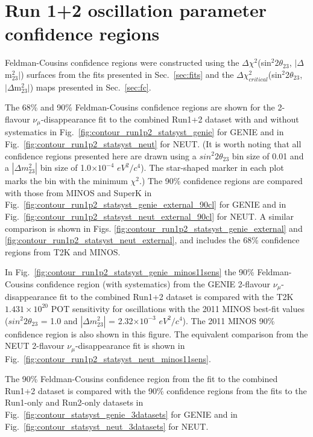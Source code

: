 \section {Run 1+2 oscillation parameter confidence regions }
\label{sec:conf_regions}

Feldman-Cousins confidence regions were constructed using the 
$\Delta\chi^{2}$(sin$^{2}$2$\theta_{23}$, $|\Delta$m$^{2}_{23}|$) surfaces
from the fits presented in Sec.\ \ref{sec:fits} and the
$\Delta\chi^{2}_{critical}$(sin$^{2}$2$\theta_{23}$, $|\Delta$m$^{2}_{23}|$) maps
presented in Sec.\ \ref{sec:fc}.

The 68\% and 90\% Feldman-Cousins confidence regions are shown for the
2-flavour $\nu_{\mu}$-disappearance fit to the combined Run1+2 dataset 
with and without systematics
in Fig.\ \ref{fig:contour_run1p2_statsyst_genie} for GENIE and
in Fig.\ \ref{fig:contour_run1p2_statsyst_neut} for NEUT.
(It is worth noting that all confidence regions presented here are drawn
using a $sin^{2}2\theta_{23}$ bin size of 0.01 and 
a $|\Delta m^{2}_{23}|$ bin size of 1.0$\times10^{-4}$ $eV^{2}/c^{4}$).
The star-shaped marker in each plot marks the bin with the minimum $\chi^{2}$.)
The 90\% confidence regions are compared with those from 
MINOS \cite{Minos2011} and SuperK \cite{OldDisappSuperK}
in Fig.\ \ref{fig:contour_run1p2_statsyst_genie_external_90cl} for GENIE and
in Fig.\ \ref{fig:contour_run1p2_statsyst_neut_external_90cl} for NEUT.
A similar comparison is shown in Figs.
\ref{fig:contour_run1p2_statsyst_genie_external} and
\ref{fig:contour_run1p2_statsyst_neut_external}, and
includes the 68\% confidence regions from T2K and MINOS.

In Fig.\ \ref{fig:contour_run1p2_statsyst_genie_minos11sens}
the 90\% Feldman-Cousins confidence region (with systematics) from the GENIE
2-flavour $\nu_{\mu}$-disappearance fit to the combined Run1+2 dataset 
is compared with the T2K $1.431 \times 10^{20}$ POT sensitivity for oscillations
with the 2011 MINOS best-fit values
($sin^{2}2\theta_{23}$ = 1.0 and $|\Delta m^{2}_{23}|$ = 2.32$\times10^{-3}$ $eV^{2}/c^{4}$).
The 2011 MINOS 90\% confidence region is also shown in this figure.
The equivalent comparison from the NEUT 2-flavour $\nu_{\mu}$-disappearance fit is shown in 
Fig.\ \ref{fig:contour_run1p2_statsyst_neut_minos11sens}.

The 90\% Feldman-Cousins confidence region from the fit to the combined Run1+2 dataset
is compared with the 90\% confidence regions from the fits to the Run1-only and Run2-only datasets 
in Fig.\ \ref{fig:contour_statsyst_genie_3datasets} for GENIE and
in Fig.\ \ref{fig:contour_statsyst_neut_3datasets} for NEUT.

